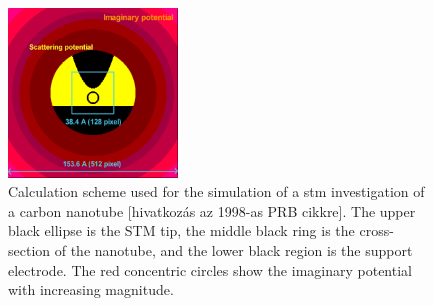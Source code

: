 \begin{figure}[hbt!]
	\centering
	\includegraphics[width=0.4\textwidth]{figures/REGIONS.png}
	\caption{Calculation scheme used for the simulation of a \acrfull{stm} investigation of a carbon nanotube [hivatkozás az
		1998-as PRB cikkre]. The upper black ellipse is the STM tip, the middle
		black ring is the cross-section of the nanotube, and the lower black
		region is the support electrode. The red concentric circles show the
		imaginary potential with increasing magnitude.}
	\label{fig:draining_potential}
\end{figure}

